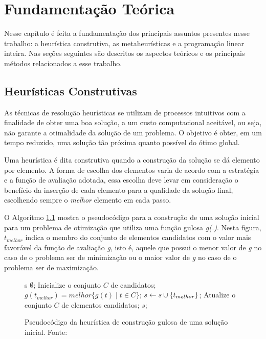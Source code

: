 \chapter{Fundamentação Teórica}


Nesse capítulo é feita a fundamentação dos principais assuntos presentes nesse
trabalho: a heurística construtiva, as metaheurísticas e a programação
linear inteira. Nas seções seguintes são descritos os aspectos teóricos e os
principais métodos relacionados a esse trabalho.

\section{Heurísticas Construtivas}
As técnicas de resolução heurísticas se utilizam de processos intuitivos com a
finalidade de obter uma boa solução, a um custo computacional aceitável, ou
seja, não garante a otimalidade da solução de um problema. O objetivo é obter,
em um tempo reduzido, uma solução tão próxima quanto possível do ótimo global.
		
Uma heurística é dita construtiva quando a construção da solução se dá elemento
por elemento. A forma de escolha dos elementos varia de acordo com a
estratégia e a função de avaliação adotada, essa escolha deve levar em
consideração o benefício da inserção de cada elemento para a qualidade da
solução final, escolhendo sempre o \emph{melhor} elemento em cada passo.
		
O Algoritmo \ref{alg:heurconsgulosa} mostra o pseudocódigo para a construção de
uma solução inicial para um problema de otimização que utiliza uma função
gulosa \emph{g(.)}. Nesta figura, \emph{$t_{melhor}$} indica o membro do
conjunto de elementos candidatos com o valor mais favorável da função de
avaliação \emph{g}, isto é, aquele que possui o menor valor de \emph{g} no caso
de o problema ser de minimização ou o maior valor de \emph{g} no caso de o
problema ser de maximização.


\begin{figure}[h]
\caption{Pseudocódigo da heurística de construção gulosa de uma solução
inicial. \newline \mbox{Fonte:
\cite{notasmarcone}} }\label{alg:heurconsgulosa}
\begin{programma}
\STATE s \GETS $\emptyset$;
\STATE Inicialize o conjunto $C$ de candidatos;
\STATE $g(t_{melhor}) = melhor\{g(t) \mid t \in C\}$;
\STATE $s \leftarrow s \cup \{t_{melhor}\}$;
\STATE Atualize o conjunto $C$ de elementos candidatos;
\ENDWHILE
\STATE\RETURN $s$;
\ENDALGORITHM
\end{programma}
\end{figure}		
		

